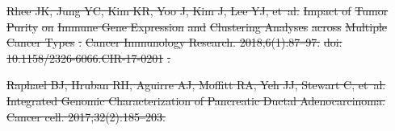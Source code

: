 \documentclass[10pt,letterpaper]{article}
\providecommand{\DIFdeltex}[1]{{\protect\color{red}\sout{#1}}}                      %
\providecommand{\DIFdelend}{} %
\providecommand{\DIFdel}[1]{\texorpdfstring{\DIFdeltex{#1}}{}} %
\DeclareRobustCommand{\DIFdelend}{\DIFOaddend \let\includegraphics\DIFOincludegraphics} %
\begin{document}
\begin{thebibliography}{10}
\DIFdel{Rhee JK, Jung YC, Kim KR, Yoo J, Kim J, Lee YJ, et~al.
	}%
\DIFdel{Impact of }%
\DIFdel{Tumor Purity}%
\DIFdel{on }%
\DIFdel{Immune Gene Expression}%
\DIFdel{and
	}%
\DIFdel{Clustering Analyses}%
\DIFdel{across }%
\DIFdel{Multiple Cancer Types}%
\DIFdel{.
	}%
\DIFdel{Cancer Immunology Research. 2018;6(1):87--97.
	}%
\DIFdel{doi:}%
\DIFdel{10.1158/2326-6066.CIR-17-0201}%
\DIFdel{.
	}%

\DIFdel{Raphael BJ, Hruban RH, Aguirre AJ, Moffitt RA, Yeh JJ, Stewart C, et~al.
	}%
\DIFdel{Integrated Genomic Characterization of Pancreatic Ductal
	Adenocarcinoma.
	}%
\DIFdel{Cancer cell. 2017;32(2):185--203.
	}\DIFdelend 

\end{thebibliography}
\end{document}
